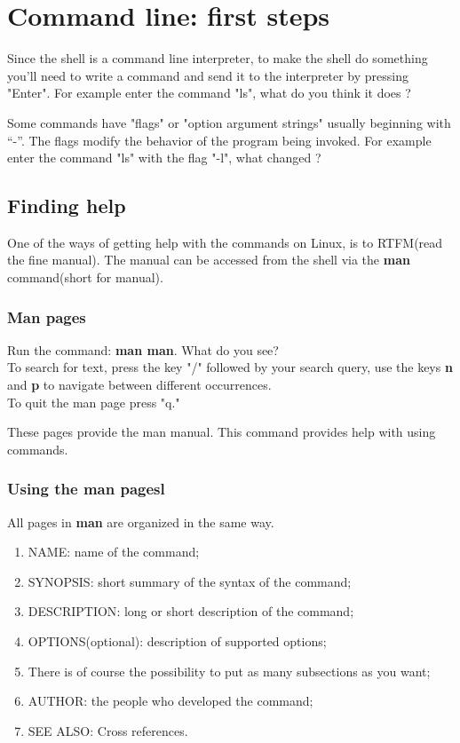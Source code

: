 \documentclass[11pt]{article}
\begin{document}
\section{Command line: first steps}
Since the shell is a command line interpreter, to make the shell do something you’ll need to write a
command and send it to the interpreter by pressing "Enter". For example enter the command "ls", what do
you think it does ? 

Some commands have "flags" or "option argument strings" usually beginning with “-”. The flags modify
the behavior of the program being invoked. For example enter the command "ls" with the flag "-l", what
changed ?



\subsection{Finding help}

One of the ways of getting help with the commands on Linux, is to RTFM(read the fine manual). The
manual can be accessed from the shell via the \textbf{man} command(short for manual).


\subsubsection{Man pages}
Run the command: \textbf{man man}. What do you see? \\ To search for text, press the key "/" followed by your search query, use the keys \textbf{n} and \textbf{p} to navigate between
different occurrences. \\ To quit the man page press "q."

\begin{solution}
These pages provide the man manual. This command provides help with using commands.
\end{solution}

\subsubsection{Using the man pagesl}
All pages in \textbf{man} are organized in the same way.


\begin{enumerate}
	\item{NAME}: name of the command;
	\item{SYNOPSIS}: short summary of the syntax of the command;
	\item{DESCRIPTION}: long or short description of the command;
	\item{OPTIONS}(optional): description of supported options;
	\item There is of course the possibility to put as many subsections as you want;
	\item{AUTHOR}: the people who developed the command;
	\item{SEE ALSO}: Cross references.	

\end{enumerate}
\end{document}
